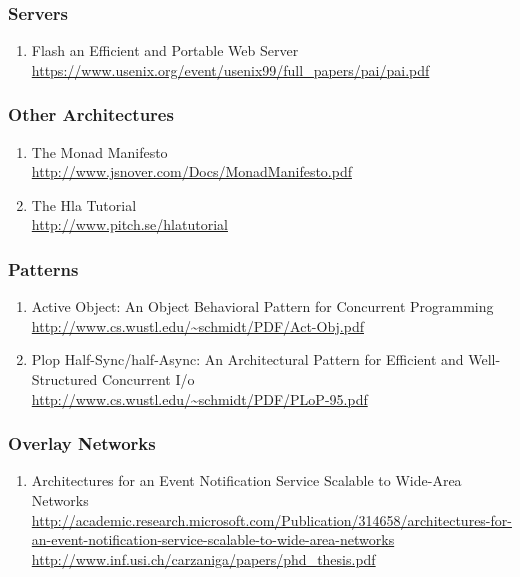 \documentclass{article}
\begin{document}
\subsubsection{Servers}
\begin{enumerate}
	\item {Flash an Efficient and Portable Web Server\\
\url{https://www.usenix.org/event/usenix99/full_papers/pai/pai.pdf}}
\end{enumerate}

\subsubsection{Other Architectures}
\begin{enumerate}
	\item {The Monad Manifesto\\
\url{http://www.jsnover.com/Docs/MonadManifesto.pdf}}
	\item {The Hla Tutorial\\
\url{http://www.pitch.se/hlatutorial}}
\end{enumerate}

\subsubsection{Patterns}
\begin{enumerate}
	\item {Active Object: An Object Behavioral Pattern for Concurrent Programming\\
\url{http://www.cs.wustl.edu/~schmidt/PDF/Act-Obj.pdf}}
	\item {Plop Half-Sync/half-Async: An Architectural Pattern for Efficient and Well-Structured Concurrent I/o\\
\url{http://www.cs.wustl.edu/~schmidt/PDF/PLoP-95.pdf}}
\end{enumerate}

\subsubsection{Overlay Networks}
\begin{enumerate}
	\item {Architectures for an Event Notification Service Scalable to Wide-Area Networks\\
\href{http://academic.research.microsoft.com/Publication/314658/architectures-for-an-event-notification-service-scalable-to-wide-area-networks}{http://academic.research.microsoft.com/Publication/314658/architectures-for-an-event-notification-service-scalable-to-wide-area-networks}\\
\url{http://www.inf.usi.ch/carzaniga/papers/phd_thesis.pdf}}
\end{enumerate}
\end{document}

